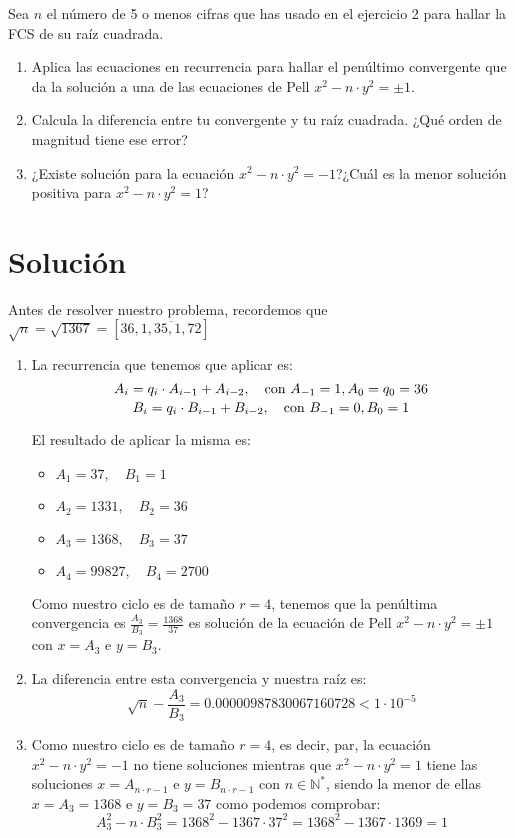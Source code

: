 	Sea $n$ el número de 5 o menos cifras que has usado en el ejercicio 2 para hallar la FCS de su raíz cuadrada.
	\begin{enumerate}
		\item Aplica las ecuaciones en recurrencia para hallar el penúltimo convergente que da la solución a una
		de las ecuaciones de Pell $x^2 - n \cdot y^2 = \pm 1$.
		\item Calcula la diferencia entre tu convergente y tu raíz cuadrada. ¿Qué orden de magnitud tiene ese error?
		\item ¿Existe solución para la ecuación $x^2 - n \cdot y^2 = -1$?¿Cuál es la menor solución positiva para
		$x^2 - n \cdot y^2 = 1$?
	\end{enumerate}

\section*{Solución}
	Antes de resolver nuestro problema, recordemos que $\sqrt{n} = \sqrt{1367} = [36, \overline{1, 35, 1, 72}]$

	\begin{enumerate}
		\item La recurrencia que tenemos que aplicar es:
		$$\left.
			A_i = q_i \cdot A_{i-1} + A_{i-2}, \quad \text{con } A_{-1} = 1, A_0 = q_0 = 36 \atop
			B_i = q_i \cdot B_{i-1} + B_{i-2}, \quad \text{con } B_{-1} = 0, B_0 = 1
		\right.$$
		
		El resultado de aplicar la misma es:
		\begin{itemize}
			\item $A_1 = 37, \quad B_1 = 1$
			\item $A_2 = 1331, \quad B_2 = 36$
			\item $A_3 = 1368, \quad B_3 = 37$
			\item $A_4 = 99827, \quad B_4 = 2700$
		\end{itemize}
		
		Como nuestro ciclo es de tamaño $r = 4$, tenemos que la penúltima convergencia es $\displaystyle
		\frac{A_3}{B_3} = \frac{1368}{37}$ es solución de la ecuación de Pell $x^2 - n \cdot y^2 = \pm 1$ con
		$x = A_3$ e $y = B_3$.
		
		\item La diferencia entre esta convergencia y nuestra raíz es:
		$$\sqrt{n} - \frac{A_3}{B_3} = 0.00000987830067160728 < 1 \cdot 10^{-5}$$
		
		\item Como nuestro ciclo es de tamaño $r = 4$, es decir, par, la ecuación $x^2 - n \cdot y^2 = -1$ no
		tiene soluciones mientras que $x^2 - n \cdot y^2 = 1$ tiene las soluciones $x = A_{n \cdot r - 1}$ e
		$y = B_{n \cdot r - 1}$ con $n \in \mathbb{N}^*$, siendo la menor de ellas $x = A_3 = 1368$ e
		$y = B_3 = 37$ como podemos comprobar:
		$$A_3^2 - n \cdot B_3^2 = 1368^2 - 1367 \cdot 37^2 = 1368^2 - 1367 \cdot 1369 = 1$$
	\end{enumerate}
